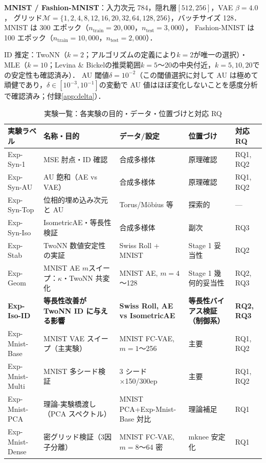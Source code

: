 \documentclass[11pt,a4paper]{jsarticle}
\begin{document}
\textbf{MNIST / Fashion-MNIST}：入力次元 784，隠れ層$[512, 256]$，VAE $\beta = 4.0$，
グリッド$\mathcal{M} = \{1,2,4,8,12,16,20,32,64,128,256\}$，バッチサイズ 128．
MNIST は 300 エポック（$n_{\mathrm{train}} = 20{,}000$，$n_{\mathrm{test}} = 3{,}000$），
Fashion-MNIST は 100 エポック（$n_{\mathrm{train}} = 10{,}000$，$n_{\mathrm{test}} = 2{,}000$）．

ID 推定：TwoNN（$k=2$；アルゴリズムの定義により$k=2$が唯一の選択）・MLE（$k=10$；Levina \& Bickel\cite{levina2005mle}の推奨範囲$k=5$〜20の中央付近，$k=5,10,20$での安定性も確認済み）\cite{facco2017twonn,levina2005mle}．
AU 閾値$\delta = 10^{-2}$\cite{lucas2019elbo}（この閾値選択に対して AU は極めて頑健であり，$\delta \in [10^{-3}, 10^{-1}]$の変動で AU 値はほぼ変化しないことを感度分析で確認済み；付録\ref{app:delta}）．

\begin{table}[H]
\centering
\caption{実験一覧：各実験の目的・データ・位置づけと対応 RQ}
\label{tab:exp_list}
\small
\begin{tabular}{lllll}
\toprule
実験ラベル & 名称・目的 & データ/設定 & 位置づけ & 対応 RQ \\
\midrule
Exp-Syn-1 & MSE 肘点・ID 確認 & 合成多様体 & 原理確認 & RQ1, RQ2 \\
Exp-Syn-AU & AU 飽和（AE vs VAE） & 合成多様体 & 原理確認 & RQ1, RQ2 \\
Exp-Syn-Top & 位相的埋め込み次元と AU & Torus/Möbius 等 & 探索的 & --- \\
Exp-Syn-Iso & IsometricAE・等長性検証 & 合成多様体 & 副次 & RQ3 \\
Exp-Stab & TwoNN 数値安定性の実証 & Swiss Roll + MNIST & Stage 1 妥当性 & RQ2 \\
Exp-Geom & MNIST AE $m$スイープ：$\kappa$・TwoNN 共変化 & MNIST AE, $m=4$〜128 & Stage 1 幾何的妥当性 & RQ2, RQ3 \\
\textbf{Exp-Iso-ID} & \textbf{等長性改善が TwoNN ID に与える影響} & \textbf{Swiss Roll, AE vs IsometricAE} & \textbf{等長性バイアス検証（制御系）} & \textbf{RQ2, RQ3} \\
Exp-Mnist-Base & MNIST VAE スイープ（主実験） & MNIST FC-VAE, $m=1$〜256 & 主要 & RQ1, RQ2 \\
Exp-Mnist-Multi & MNIST 多シード検証 & 3 シード×150/300ep & 主要 & RQ1, RQ2 \\
Exp-Mnist-PCA & 理論-実験橋渡し（PCA スペクトル） & MNIST PCA+Exp-Mnist-Base 対比 & 理論補足 & RQ1 \\
Exp-Mnist-Dense & 密グリッド検証（3因子分離） & MNIST FC-VAE, $m=8$〜64 密 & mknee 安定化 & RQ1 \\

\end{tabular}
\end{table}
\end{document}

